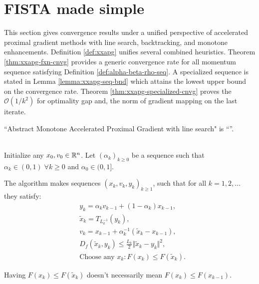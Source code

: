 \documentclass[12pt]{report}
\begin{document}
    \section{FISTA made simple}
        This section gives convergence results under a unified perspective of accelerated proximal gradient methods with line search, backtracking, and monotone enhancements. 
        Definition \ref{def:xxapg} unifies several combined heuristics. 
        Theorem \ref{thm:xxapg-fxn-cnvg} provides a generic convergence rate for all momentum sequence satisfying Definition \ref{def:alpha-beta-rho-seq}. 
        A specialized sequence is stated in Lemma \ref{lemma:xxapg-seq-bnd} which attains the lowest upper bound on the convergence rate. 
        Theorem \ref{thm:xxapg-specialized-cnvg} proves the $\mathcal O(1/k^2)$ for optimality gap and, the norm of gradient mapping on the last iterate. 
        \par
        ``Abstract Monotone Accelerated Proximal Gradient with line search" is ``\XXAPG{}''. 
        \begin{definition}[\XXAPG{}]\label{def:xxapg}\;\\ 
            Initialize any $x_0, v_0 \in \mathbb R^n$. 
            Let $(\alpha_k)_{k \ge 0}$ be a sequence such that $\alpha_k \in (0, 1) \;\forall k \ge 0$ and $\alpha_0 \in (0, 1]$. 
            \begin{tcolorbox}
                The algorithm makes sequences $(x_k, v_k, y_k)_{k \ge 1}$, such that for all $k = 1, 2, \ldots$ they satisfy: 
                \begin{align*}
                    & y_k = \alpha_k v_{k - 1} + (1 - \alpha_k) x_{k - 1}, \\
                    & \tilde x_k = T_{L_k^{-1}}(y_{k}), \\ 
                    & v_k = x_{k - 1} + \alpha_k^{-1}(\tilde x_k - x_{k - 1}), \\
                    & D_{f}(\tilde x_k, y_k) \le \frac{L_k}{2}\Vert \tilde x_k - y_k\Vert^2, \\
                    & \text{Choose any } x_k: F(x_k) \le F(\tilde x_k). 
                \end{align*}    
            \end{tcolorbox}
        \end{definition}
        \begin{remark}
            Having $F(x_k) \le F(\tilde x_k)$ doesn't necessarily mean $F(x_k) \le F(x_{k - 1})$. 
        \end{remark}
\end{document}
